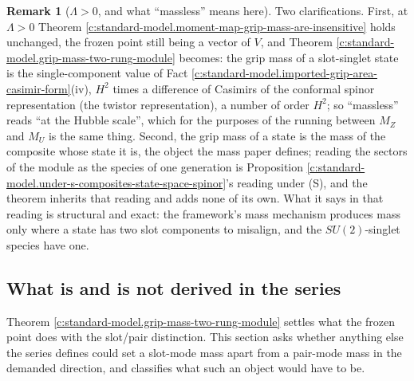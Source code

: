 \documentclass[11pt]{article}
\theoremstyle{definition}
\newtheorem{remark}[theorem]{Remark}
\theoremstyle{plain}
\newcommand{\changedmark}[2]{\marginpar{\raggedright\scriptsize\color{#1}#2}}
\begin{document}
\begin{remark}[$\Lambda > 0$, and what ``massless'' means here]\label{c:note.standard-model.0-what-massless-means-here}
\changedmark{gray}{reworded}
Two clarifications. First, at $\Lambda > 0$ Theorem \ref{c:standard-model.moment-map-grip-mass-are-insensitive} holds unchanged, the frozen point still being a vector of $V$, and Theorem \ref{c:standard-model.grip-mass-two-rung-module} becomes: the grip mass of a slot-singlet state is the single-component value of Fact \ref{c:standard-model.imported-grip-area-casimir-form}(iv), $H^{2}$ times a difference of Casimirs of the conformal spinor representation (the twistor representation), a number of order $H^{2}$; so ``massless'' reads ``at the Hubble scale'', which for the purposes of the running between $M_{Z}$ and $M_{U}$ is the same thing. Second, the grip mass of a state is the mass of the composite whose state it is, the object the mass paper defines; reading the sectors of the module as the species of one generation is Proposition \ref{c:standard-model.under-s-composites-state-space-spinor}'s reading under (S), and the theorem inherits that reading and adds none of its own. What it says in that reading is structural and exact: the framework's mass mechanism produces mass only where a state has two slot components to misalign, and the $SU(2)$-singlet species have one.
\end{remark}

\subsection*{What is and is not derived in the series}
\label{c:note.standard-model.setting-what-not-derived-series}
Theorem \ref{c:standard-model.grip-mass-two-rung-module} settles what the frozen point does with the slot/pair distinction. This section asks whether anything else the series defines could set a slot-mode mass apart from a pair-mode mass in the demanded direction, and classifies what such an object would have to be.
\end{document}
